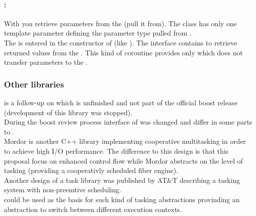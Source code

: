 \paragraph*{\pullcoro:}
With \pullcoro you retrieve parameters from the \corofunction (pull it from).
The class has only one template parameter defining the parameter type pulled
from \corofunction.\\
\newline
The \corofunction is entered in the constructor of \corofunction (like \coro).
The interface contains \coroget to retrieve returned values from the
\corofunction.  This kind of coroutine provides only \pullcoroop which
does not transfer parameters to the \corofunction.

\subsubsection*{Other libraries}
\boostcoroutine is a follow-up on \boostcorosum which is unfinished and
not part of the official boost release (development of this library was
stopped).\\
During the boost review process interface of \boostcoroutine was changed and
differ in some parts to \boostcorosum.\\
Mordor\cite{mordor} is another C++ library implementing cooperative multitasking
in order to achieve high I/O performance. The difference to this design is that
this proposal focus on enhanced control flow while Mordor\cite{mordor} abstracts
on the level of tasking (providing a cooperativly scheduled fiber engine).\\
Another design of a task library was published by AT\&T\cite{atnt1989} describing
a tasking system with non-preemtive scheduling.\\
\coro could be used as the basis for such kind of tasking abstractions provinding
an abstraction to switch between different execution contexts.\\
